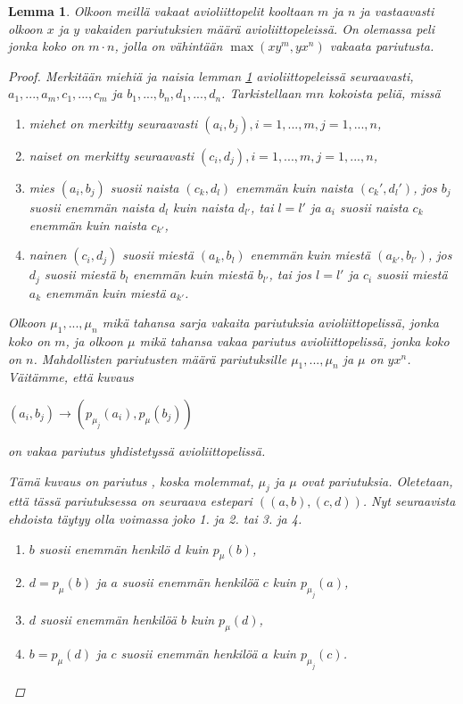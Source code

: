 \documentclass[finnish]{tktltiki2}
\newtheorem{lem}[lau]{Lemma}
\theoremstyle{definition}
\theoremstyle{remark}
\begin{document}
\begin{lem} \cite[s. 23]{gusfield1989stable} \label{lemma-koko}
Olkoon meillä vakaat avioliittopelit kooltaan $m$ ja $n$ ja vastaavasti olkoon $x$ ja $y$ vakaiden pariutuksien määrä avioliittopeleissä. On olemassa peli jonka koko on $m \cdot n$, jolla on vähintään $\max(xy^m, yx^n)$ vakaata pariutusta.

\begin{proof}\cite[s. 23]{gusfield1989stable}
Merkitään miehiä ja naisia lemman \ref{lemma-koko} avioliittopeleissä seuraavasti, $a_1,...,a_{m}, c_1,...,c_{m}$ ja $b_1,...,b_{n}, d_1,...,d_{n}$. Tarkistellaan $mn$ kokoista peliä, missä
\begin{enumerate}
\item miehet on merkitty seuraavasti $(a_i,b_j), i = 1,...,m, j = 1,...,n$,
\item naiset on merkitty seuraavasti $(c_i,d_j), i = 1,...,m, j = 1,...,n$,
\item mies $(a_i, b_j)$ suosii naista $(c_k, d_l)$ enemmän kuin naista $(c_k',d_l')$, jos $b_j$ suosii enemmän naista $d_l$ kuin naista $d_{l'}$, tai $l = l'$ ja $a_i$ suosii naista $c_k$ enemmän kuin naista $c_{k'}$,
\item nainen $(c_i, d_j)$ suosii miestä $(a_k, b_l)$ enemmän kuin miestä $(a_{k'}, b_{l'})$, jos $d_j$ suosii miestä $b_l$ enemmän kuin miestä $b_{l'}$, tai jos $l = l'$ ja $c_i$ suosii miestä $a_k$ enemmän kuin miestä $a_{k'}$.
\end{enumerate}

Olkoon $\mu_{1},...,\mu_{n}$ mikä tahansa sarja vakaita pariutuksia avioliittopelissä, jonka koko on $m$, ja olkoon $\mu$ mikä tahansa vakaa pariutus avioliittopelissä, jonka koko on $n$. Mahdollisten pariutusten määrä pariutuksille $\mu_{1},...,\mu_{n}$ ja $\mu$ on $yx^n$. Väitämme, että kuvaus

$(a_i, b_j) \longrightarrow (p_{\mu_{j}}(a_i),p_{\mu}(b_j))$

on vakaa pariutus yhdistetyssä avioliittopelissä.

Tämä kuvaus on pariutus , koska molemmat, $\mu_j$ ja $\mu$ ovat pariutuksia. Oletetaan, että tässä pariutuksessa on seuraava estepari $((a,b),(c,d))$. Nyt seuraavista ehdoista täytyy olla voimassa joko 1. ja 2. tai 3. ja 4.

\begin{enumerate}
	\item $b$ suosii enemmän henkilö $d$ kuin $p_\mu(b)$,
	\item $d = p_\mu(b)$ ja $a$ suosii enemmän henkilöä $c$ kuin $p_{\mu_{j}}(a)$,
	\item $d$ suosii enemmän henkilöä $b$ kuin $p_\mu(d)$,
	\item $b = p_\mu(d)$ ja $c$ suosii enemmän henkilöä $a$ kuin $p_{\mu_{j}}(c)$.
\end{enumerate}


\end{proof}
\end{lem}
\end{document}
